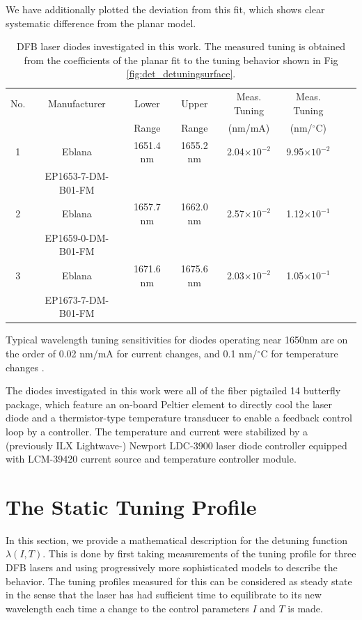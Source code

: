 \documentclass[8pt,a4paper]{report}
\begin{document}
	We have additionally plotted the deviation from this fit, which shows clear systematic difference from the planar model.
	
	\begin{table}[H] 
		\begin{center}
			\caption{DFB laser diodes investigated in this work. The measured tuning is obtained from the coefficients of the planar fit to the tuning behavior shown in Fig \ref{fig:det_detuningsurface}.}\label{table:diodes}
			\begin{tabular}{|c|c|c|c|c|c|c|c|}
				\hline
				No. & Manufacturer & Lower & Upper  & Meas. Tuning & Meas. Tuning \\
				& & Range & Range & (nm/mA) & (nm/$^\circ$C) \\
				\hline
				1 & Eblana & 1651.4 nm & 1655.2 nm & 2.04$\times10^{-2}$ & 9.95$\times10^{-2}$ \\
				 & EP1653-7-DM-B01-FM & & & &  \\
				\hline
				2 & Eblana & 1657.7 nm & 1662.0 nm & 2.57$\times10^{-2}$ & 1.12$\times10^{-1}$ \\
				& EP1659-0-DM-B01-FM & & & &  \\
				\hline
				3 & Eblana & 1671.6 nm & 1675.6 nm & 2.03$\times10^{-2}$ & 1.05$\times10^{-1}$ \\
				& EP1673-7-DM-B01-FM & & & &  \\
				\hline
			\end{tabular}
		\end{center}
	\end{table}
	
	
	Typical wavelength tuning sensitivities for diodes operating near 1650nm are on the order of 0.02 nm/mA for current changes, and 0.1 nm/$^\circ$C for temperature changes \cite{crds_co2_scanning_noaom}.
	
	The diodes investigated in this work were all of the fiber pigtailed 14 butterfly package, which feature an on-board Peltier element to directly cool the laser diode and a thermistor-type temperature transducer to enable a feedback control loop by a controller. The temperature and current were stabilized by a (previously ILX Lightwave-) Newport LDC-3900 laser diode controller equipped with LCM-39420 current source and temperature controller module.
	
	\section{The Static Tuning Profile}
	In this section, we provide a mathematical description for the detuning function $\lambda(I,T)$. This is done by first taking measurements of the tuning profile for three DFB lasers and using progressively more sophisticated models to describe the behavior. The tuning profiles measured for this can be considered as steady state in the sense that the laser has had sufficient time to equilibrate to its new wavelength each time a change to the control parameters $I$ and $T$ is made.
	
\end{document}
